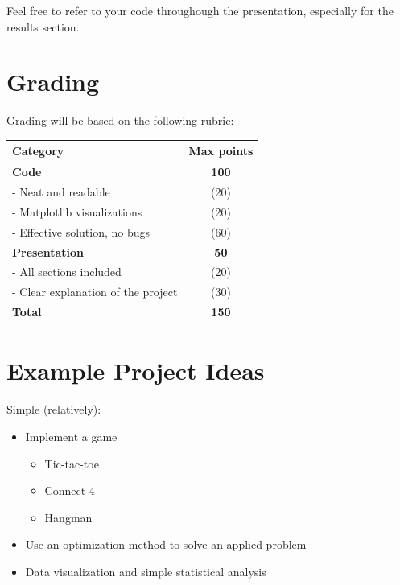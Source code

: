 \documentclass[12pt]{article}%
\begin{document}
Feel free to refer to your code throughough the presentation, especially for the results section.

\section{Grading}

Grading will be based on the following rubric:

\begin{center}
	\begin{tabular}{ |l|c| } 
		\hline
		Category & Max points \\
		\hline
		\hline
		\textbf{Code} & \textbf{100} \\
		\hspace{10pt} - Neat and readable & (20) \\
		\hspace{10pt} - Matplotlib visualizations & (20) \\
		\hspace{10pt} - Effective solution, no bugs & (60) \\
		\hline
		\textbf{Presentation}	& \textbf{50} \\
		\hspace{10pt} - All sections included & (20) \\
		\hspace{10pt} - Clear explanation of the project & (30) \\
		\hline
		\textbf{Total} & \textbf{150} \\
		\hline
	\end{tabular}
\end{center}

\section{Example Project Ideas}

Simple (relatively):
\begin{itemize}
	\setlength\itemsep{-2pt}
	\item Implement a game 
	\begin{itemize}
		\setlength\itemsep{-2pt}
		\item Tic-tac-toe
		\item Connect 4
		\item Hangman
	\end{itemize}
	\item Use an optimization method to solve an applied problem
	\item Data visualization and simple statistical analysis
\end{itemize}
\end{document}
